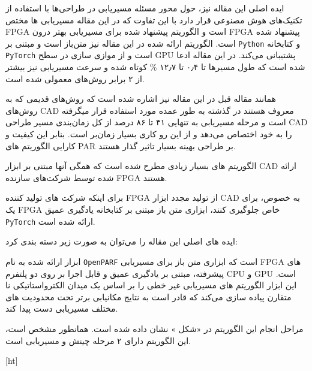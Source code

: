 


ایده اصلی این مقاله نیز، حول محور مسئله مسیریابی در طراحی‌ها با استفاده از تکنیک‌های هوش مصنوعی قرار دارد با این تفاوت که در این مقاله مسیر‌یابی ها مختص FPGA است و الگوریتم پیشنهاد شده برای مسیریابی بهتر درون FPGA پیشنهاد شده است. الگوریتم ارائه شده در این مقاله نیز متن‌باز است و مبتنی بر \texttt{Python} و کتابخانه \texttt{PyTorch} است و از موازی سازی در سطح GPU پشتیبانی می‌کند. در این مقاله ادعا شده است که طول مسیرها تا ۰٫۴ تا ۱۲٫۷ \% کوتاه شده و سرعت مسیریابی نیز بیشتر از ۲ برابر روش‌های معمولی شده است.






همانند مقاله قبل در این مقاله نیز اشاره شده است که روش‌های قدیمی که به روش‌های CAD معروف هستند در گذشته به طور عمده مورد استفاده قرار میگرفته است و مرحله مسیریابی به تنهایی ۴۱ تا ۸۶ درصد از کل زمان‌بندی مسیر طراحی CAD را به خود اختصاص می‌دهد  و از این رو کاری بسیار زمان‌بر است. بنابر این کیفیت و کارایی الگوریتم های PAR بر طراحی بهینه بسیار تاثیر گذار هستند.


الگوریتم های بسیار زیادی مطرح شده است که همگی آنها مبتنی بر ابزار CAD ارائه شده توسط شرکت‌های سازنده FPGA هستند.

برای اینکه شرکت های تولید کننده FPGA از تولید مجدد ابزار CAD به خصوص، برای یک FPGA خاص جلوگیری کنند، ابزاری متن باز مبتنی بر کتابخانه یادگیری عمیق \texttt{PyTorch} ارائه شده است.

ایده های اصلی این مقاله را می‌توان به صورت زیر دسته بندی کرد:


 ابزار ارائه شده به نام \texttt{OpenPARF} است که ابزاری متن باز برای مسیریابی FPGA های پیشرفته، مبتنی بر یادگیری عمیق و قابل اجرا بر روی دو پلتفرم CPU و GPU است.
 این ابزار الگوریتم های مسیریابی غیر خطی را بر اساس یک میدان الکترواستاتیکی نا متقارن پیاده سازی می‌کند که قادر است به نتایج مکانیابی برتر تحت محدودیت های مختلف مسیریابی دست پیدا کند.




مراحل انجام این الگوریتم در «شکل » نشان داده شده است. همانطور مشخص است، این الگوریتم دارای ۲ مرحله چینش و مسیریابی است.



[ht]



